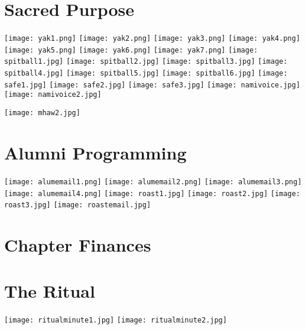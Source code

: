   \section{Sacred Purpose}
    \texttt{[image: yak1.png]}
    \texttt{[image: yak2.png]}
    \texttt{[image: yak3.png]}
    \texttt{[image: yak4.png]}
    \texttt{[image: yak5.png]}
    \texttt{[image: yak6.png]}
    \texttt{[image: yak7.png]}
    \texttt{[image: spitball1.jpg]}
    \texttt{[image: spitball2.jpg]}
    \texttt{[image: spitball3.jpg]}
    \texttt{[image: spitball4.jpg]}
    \texttt{[image: spitball5.jpg]}
    \texttt{[image: spitball6.jpg]}
    \texttt{[image: safe1.jpg]}
    \texttt{[image: safe2.jpg]}
    \texttt{[image: safe3.jpg]}
    \texttt{[image: namivoice.jpg]}
    \texttt{[image: namivoice2.jpg]}
    
    \texttt{[image: mhaw2.jpg]}
    
    
  \section{Alumni Programming}
    \texttt{[image: alumemail1.png]}
    \texttt{[image: alumemail2.png]}
    \texttt{[image: alumemail3.png]}
    \texttt{[image: alumemail4.png]}
    \texttt{[image: roast1.jpg]}
    \texttt{[image: roast2.jpg]}
    \texttt{[image: roast3.jpg]}
    \texttt{[image: roastemail.jpg]}
    
  
  \section{Chapter Finances}
    
    
    
    
    
    
    
  
  \section{The Ritual}
    \texttt{[image: ritualminute1.jpg]}
    \texttt{[image: ritualminute2.jpg]}
    
    
    
    
